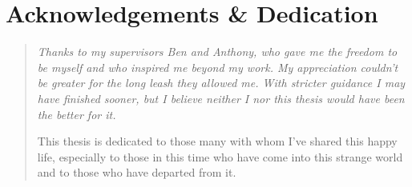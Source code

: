 
\section*{Acknowledgements \& Dedication}

\begin{quote}
\itshape
Thanks to my supervisors Ben and Anthony, who gave me the freedom to be myself and who inspired me beyond my work.
My appreciation couldn't be greater for the long leash they allowed me.
With stricter guidance I may have finished sooner, but I believe neither I nor this thesis would have been the better for it.

\medskip
\noindent
This thesis is dedicated to those many with whom I've shared this happy life, especially to those in this time who have come into this strange world and to those who have departed from it.
\end{quote}
